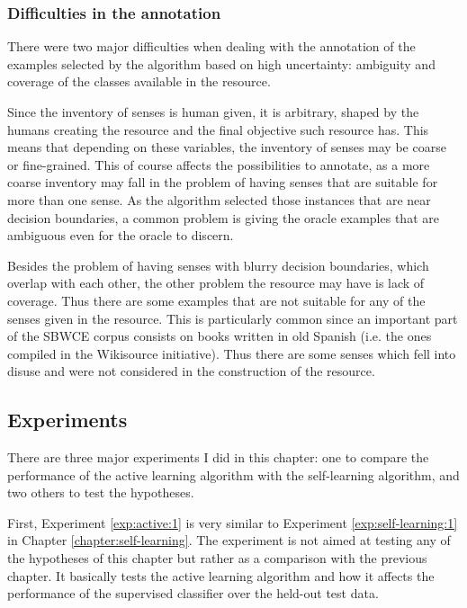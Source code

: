 \subsubsection{Difficulties in the annotation}\label{sec:active:difficulties}

There were two major difficulties when dealing with the annotation of the
examples selected by the algorithm based on high uncertainty: ambiguity and
coverage of the classes available in the resource.

Since the inventory of senses is human given, it is arbitrary, shaped by the
humans creating the resource and the final objective such resource has. This
means that depending on these variables, the inventory of senses may be coarse
or fine-grained. This of course affects the possibilities to annotate, as a
more coarse inventory may fall in the problem of having senses that are
suitable for more than one sense. As the algorithm selected those instances
that are near decision boundaries, a common problem is giving the oracle
examples that are ambiguous even for the oracle to discern.

Besides the problem of having senses with blurry decision boundaries, which
overlap with each other, the other problem the resource may have is lack of
coverage. Thus there are some examples that are not suitable for any of the
senses given in the resource. This is particularly common since an important
part of the SBWCE corpus consists on books written in old Spanish (i.e. the
ones compiled in the Wikisource initiative). Thus there are some senses which
fell into disuse and were not considered in the construction of the resource.

\subsection{Experiments}\label{sec:active:experiments}

There are three major experiments I did in this chapter: one to compare the
performance of the active learning algorithm with the self-learning algorithm,
and two others to test the hypotheses.

First, Experiment \ref{exp:active:1} is very similar to Experiment
\ref{exp:self-learning:1} in Chapter \ref{chapter:self-learning}. The
experiment is not aimed at testing any of the hypotheses of this chapter but
rather as a comparison with the previous chapter. It basically tests the active
learning algorithm and how it affects the performance of the supervised
classifier over the held-out test data.

